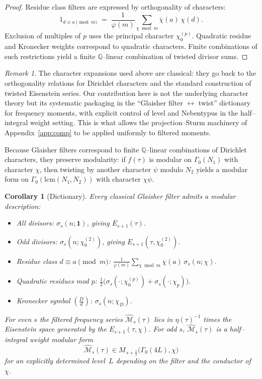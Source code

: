 \documentclass[11pt]{article}
\newtheorem{corollary}[theorem]{Corollary}
\theoremstyle{definition}
\theoremstyle{remark}
\newtheorem{remark}[theorem]{Remark}
\begin{document}
\begin{proof}
Residue class filters are expressed by orthogonality of characters:
\[
1_{d\equiv a\pmod m}
\;=\;\frac{1}{\varphi(m)}\sum_{\chi\bmod m} \overline{\chi}(a)\,\chi(d).
\]
Exclusion of multiples of $p$ uses the principal character $\chi_0^{(p)}$.
Quadratic residue and Kronecker weights correspond to quadratic characters.
Finite combinations of such restrictions yield a finite $\mathbb{Q}$--linear
combination of twisted divisor sums.
\end{proof}

\begin{remark}
The character expansions used above are classical: they go back to the
orthogonality relations for Dirichlet characters and the standard
construction of twisted Eisenstein series. Our contribution here is not
the underlying character theory but its systematic packaging in the
“Glaisher filter $\leftrightarrow$ twist” dictionary for frequency moments,
with explicit control of level and Nebentypus in the half--integral
weight setting. This is what allows the projection--Sturm machinery of
Appendix~\ref{app:comp} to be applied uniformly to filtered moments.
\end{remark}

Because Glaisher filters correspond to finite $\mathbb{Q}$--linear
combinations of Dirichlet characters, they preserve modularity: if
$f(\tau)$ is modular on $\Gamma_0(N_1)$ with character $\chi$, then
twisting by another character $\psi$ modulo $N_2$ yields a modular form
on $\Gamma_0(\mathrm{lcm}(N_1,N_2))$ with character $\chi\psi$.

\begin{corollary}[Dictionary]\label{cor:glaisher-dict}
Every classical Glaisher filter admits a modular description:
\begin{itemize}
  \item All divisors: $\sigma_s(n;\mathbf 1)$, giving $E_{s+1}(\tau)$.
  \item Odd divisors: $\sigma_s(n;\chi_0^{(2)})$, giving $E_{s+1}(\tau,\chi_0^{(2)})$.
  \item Residue class $d\equiv a\pmod m$: 
  $\tfrac1{\varphi(m)}\sum_{\chi\bmod m}\overline{\chi}(a)\,\sigma_s(n;\chi)$.
  \item Quadratic residues mod $p$: 
  $\tfrac12\big(\sigma_s(\cdot;\chi_0^{(p)})+\sigma_s(\cdot;\chi_p)\big)$.
  \item Kronecker symbol $(\tfrac{D}{d})$: $\sigma_s(n;\chi_D)$.
\end{itemize}
For even $s$ the filtered frequency series $\widehat{\mathcal M}_s(\tau)$
lies in $\eta(\tau)^{-1}$ times the Eisenstein space generated by the
$E_{s+1}(\tau,\chi)$. For odd $s$, $\widehat{\mathcal M}_s(\tau)$ is a
half--integral weight modular form
\[
\widehat{\mathcal M}_s(\tau)
\in M_{\,s+\tfrac12}\!\bigl(\Gamma_0(4L),\chi\bigr)
\]
for an explicitly determined level~$L$ depending on the filter
and the conductor of~$\chi$.
\end{corollary}
\end{document}
